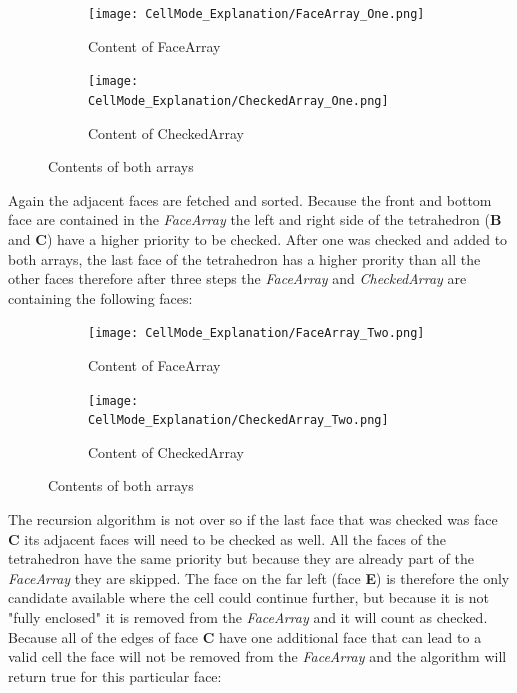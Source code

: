 \documentclass{report}
\begin{document}
		\begin{figure}[H]
			\centering
			\begin{subfigure}[H]{2.5in}
				\centering
				\texttt{[image: CellMode\_Explanation/FaceArray\_One.png]}
				\caption{Content of FaceArray}
				\label{pic:pic5.4.a}
			\end{subfigure}
			\quad
			\begin{subfigure}[H]{2.5in}
				\centering
				\texttt{[image: CellMode\_Explanation/CheckedArray\_One.png]}
				\caption{Content of CheckedArray}
				\label{pic:pic5.4.b}
			\end{subfigure}
			\caption{Contents of both arrays}
			\label{pic:pic5.4}
		\end{figure}
		\noindent Again the adjacent faces are fetched and sorted. Because the front and bottom face are contained in the \textit{FaceArray} the left and right side of the tetrahedron (\textbf{B} and \textbf{C}) have a higher priority to be checked. After one was checked and added to both arrays, the last face of the tetrahedron has a higher prority than all the other faces therefore after three steps the \textit{FaceArray} and \textit{CheckedArray} are containing the following faces: \\
		\begin{figure}[H]
			\centering
			\begin{subfigure}[H]{2.5in}
				\centering
				\texttt{[image: CellMode\_Explanation/FaceArray\_Two.png]}
				\caption{Content of FaceArray}
				\label{pic:pic5.5.a}
			\end{subfigure}
			\quad
			\begin{subfigure}[H]{2.5in}
				\centering
				\texttt{[image: CellMode\_Explanation/CheckedArray\_Two.png]}
				\caption{Content of CheckedArray}
				\label{pic:pic5.5.b}
			\end{subfigure}
			\caption{Contents of both arrays}
			\label{pic:pic5.5}
		\end{figure}
		\noindent The recursion algorithm is not over so if the last face that was checked was face \textbf{C} its adjacent faces will need to be checked as well. All the faces of the tetrahedron have the same priority but because they are already part of the \textit{FaceArray} they are skipped. The face on the far left (face \textbf{E}) is therefore the only candidate available where the cell could continue further, but because it is not "fully enclosed" it is removed from the \textit{FaceArray} and it will count as checked. Because all of the edges of face \textbf{C} have one additional face that can lead to a valid cell the face will not be removed from the \textit{FaceArray} and the algorithm will return true for this particular face:
\end{document}
